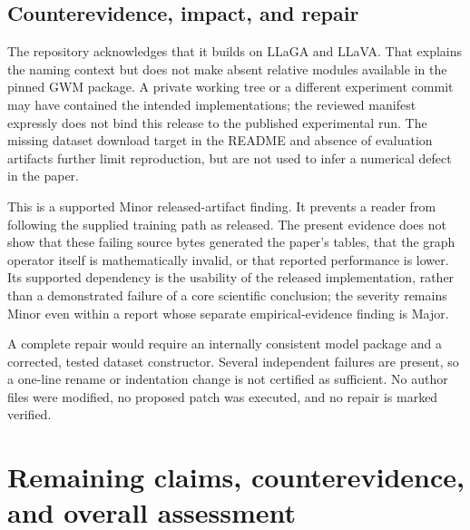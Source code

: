 \documentclass[10pt]{article}
\begin{document}
\subsection*{Counterevidence, impact, and repair}
The repository acknowledges that it builds on LLaGA and LLaVA. That explains the naming context but does not make absent relative modules available in the pinned GWM package. A private working tree or a different experiment commit may have contained the intended implementations; the reviewed manifest expressly does not bind this release to the published experimental run. The missing dataset download target in the README and absence of evaluation artifacts further limit reproduction, but are not used to infer a numerical defect in the paper.\par
This is a supported Minor released-artifact finding. It prevents a reader from following the supplied training path as released. The present evidence does not show that these failing source bytes generated the paper’s tables, that the graph operator itself is mathematically invalid, or that reported performance is lower. Its supported dependency is the usability of the released implementation, rather than a demonstrated failure of a core scientific conclusion; the severity remains Minor even within a report whose separate empirical-evidence finding is Major.\par
A complete repair would require an internally consistent model package and a corrected, tested dataset constructor. Several independent failures are present, so a one-line rename or indentation change is not certified as sufficient. No author files were modified, no proposed patch was executed, and no repair is marked verified.\par
\section*{Remaining claims, counterevidence, and overall assessment}
\end{document}
